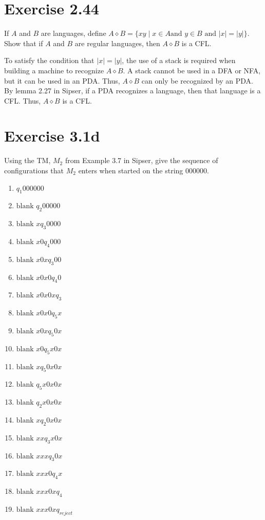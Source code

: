 \documentclass{article}
\newcommand{\where}{\mid}
\begin{document}
\section{Exercise 2.44}

If $A$ and $B$ are languages, define $A \diamond B = \{xy \where x \in A \text{
and } y \in B \text{ and } |x| = |y|\}$. Show that if $A$ and $B$ are regular
languages, then $A \diamond B$ is a CFL.

To satisfy the condition that $|x| = |y|$, the use of a stack is required when
building a machine to recognize $A \diamond B$. A stack cannot be used in a DFA
or NFA, but it can be used in an PDA. Thus, $A \diamond B$ can only be
recognized by an PDA. By lemma 2.27 in Sipser, if a PDA recognizes a language,
then that language is a CFL. Thus, $A \diamond B$ is a CFL.

\section{Exercise 3.1d}

Using the TM, $M_2$ from Example 3.7 in Sipser, give the sequence of
configurations that $M_2$ enters when started on the string 000000. 

\begin{enumerate}
  \item $q_1 000000$
  \item $\text{blank } q_2 00000$
  \item $\text{blank } x q_3 0000$
  \item $\text{blank } x0 q_4 000$
  \item $\text{blank } x0x q_3 00$
  \item $\text{blank } x0x0 q_4 0$
  \item $\text{blank } x0x0x q_3$
  \item $\text{blank } x0x0 q_5 x$
  \item $\text{blank } x0x q_5 0x$
  \item $\text{blank } x0 q_5 x0x$
  \item $\text{blank } x q_5 0x0x$
  \item $\text{blank } q_5 x0x0x$
  \item $\text{blank } q_2 x0x0x$
  \item $\text{blank } x q_2 0x0x$
  \item $\text{blank } xx q_3 x0x$
  \item $\text{blank } xxx q_3 0x$
  \item $\text{blank } xxx0 q_4 x$
  \item $\text{blank } xxx0x q_4$
  \item $\text{blank } xxx0x q_{reject}$
\end{enumerate}
\end{document}
